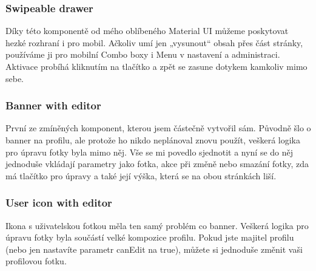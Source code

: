 \subsubsection{Swipeable drawer}
Díky této komponentě od mého oblíbeného Material UI můžeme poskytovat hezké rozhraní i pro mobil. Ačkoliv umí jen „vysunout“ obsah přes část stránky, používáme ji pro mobilní Combo boxy i Menu v nastavení a administraci. Aktivace probíhá kliknutím na tlačítko a zpět se zasune dotykem kamkoliv mimo sebe.

\subsubsection{Banner with editor}
První ze zmíněných komponent, kterou jsem částečně vytvořil sám. Původně šlo o banner na profilu, ale protože ho nikdo neplánoval znovu použít, veškerá logika pro úpravu fotky byla mimo něj. Vše se mi povedlo sjednotit a nyní se do něj jednoduše vkládají parametry jako fotka, akce při změně nebo smazání fotky, zda má tlačítko pro úpravy a také její výška, která se na obou stránkách liší.

\subsubsection{User icon with editor}
Ikona s uživatelskou fotkou měla ten samý problém co banner. Veškerá logika pro úpravu fotky byla součástí velké kompozice profilu. Pokud jste majitel profilu (nebo jen nastavíte parametr canEdit na true), můžete si jednoduše změnit vaši profilovou fotku.
